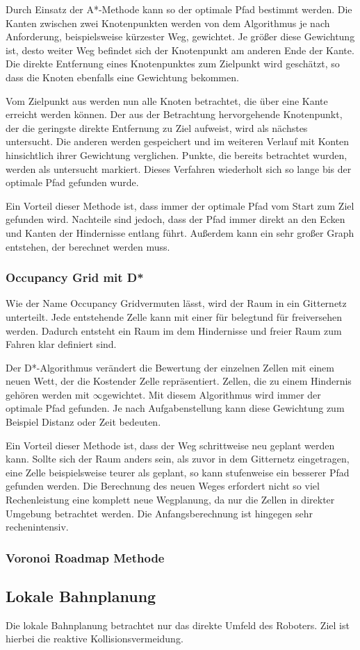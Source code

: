 Durch Einsatz der A*-Methode kann so der optimale Pfad bestimmt werden. Die Kanten zwischen zwei Knotenpunkten werden von dem Algorithmus je nach Anforderung, beispielsweise kürzester Weg, gewichtet. Je größer diese Gewichtung ist, desto weiter Weg befindet sich der Knotenpunkt am anderen Ende der Kante. Die direkte Entfernung eines Knotenpunktes zum Zielpunkt wird geschätzt, so dass die Knoten ebenfalls eine Gewichtung bekommen. 

Vom Zielpunkt aus werden nun alle Knoten betrachtet, die über eine Kante erreicht werden können. Der aus der Betrachtung hervorgehende Knotenpunkt, der die geringste direkte Entfernung zu Ziel aufweist, wird als nächstes untersucht. Die anderen werden gespeichert und im weiteren Verlauf mit Konten hinsichtlich ihrer Gewichtung verglichen. Punkte, die bereits betrachtet wurden, werden  als \glqq untersucht \grqq markiert. Dieses Verfahren wiederholt sich so lange bis der optimale Pfad gefunden wurde. 

Ein Vorteil dieser Methode ist, dass immer der optimale Pfad vom Start zum Ziel gefunden wird. Nachteile sind jedoch, dass der Pfad immer direkt an den Ecken und Kanten der Hindernisse entlang führt. Außerdem kann ein sehr großer Graph entstehen, der berechnet werden muss. 

\subsubsection{Occupancy Grid mit D*}
Wie der Name \glqq Occupancy Grid\grqq vermuten lässt, wird der Raum in ein Gitternetz unterteilt. Jede entstehende Zelle kann mit einer \grqq für \glqq belegt\grqq und \grqq für \glqq frei\grqq versehen werden. Dadurch entsteht ein Raum im dem Hindernisse und freier Raum zum Fahren klar definiert sind. 

Der D*-Algorithmus verändert die Bewertung der einzelnen Zellen mit einem neuen Wett, der die \glqq Kosten\grqq der Zelle repräsentiert. Zellen, die zu einem Hindernis gehören werden mit \glqq $ \infty $\grqq gewichtet. Mit diesem Algorithmus wird immer der optimale Pfad gefunden. Je nach Aufgabenstellung kann diese Gewichtung zum Beispiel Distanz oder Zeit bedeuten. 

Ein Vorteil dieser Methode ist, dass der Weg schrittweise neu geplant werden kann. Sollte sich der Raum anders sein, als zuvor in dem Gitternetz eingetragen, eine Zelle beispielsweise teurer als geplant, so kann stufenweise ein besserer Pfad gefunden werden. Die Berechnung des neuen Weges erfordert nicht so viel Rechenleistung eine komplett neue Wegplanung, da nur die Zellen in direkter Umgebung betrachtet werden. Die Anfangsberechnung ist hingegen sehr rechenintensiv. 

\subsubsection{Voronoi Roadmap Methode}

\subsection{Lokale Bahnplanung}
Die lokale Bahnplanung betrachtet nur das direkte Umfeld des Roboters. Ziel ist hierbei die reaktive Kollisionsvermeidung.
